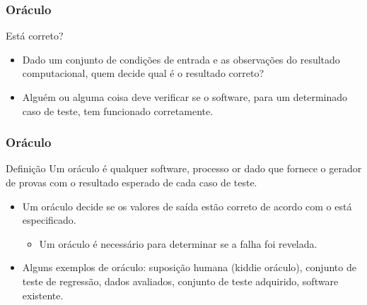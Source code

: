 \begin{frame}[parent={cmap:software-testing-foundations}, hasprev=false, hasnext=true]
\frametitle{Oráculo}

\begin{block:fact}{Está correto?}
\begin{itemize}
	\item Dado um conjunto de condições de entrada e as observações do resultado computacional, quem decide qual é o resultado correto?

	\item Alguém ou alguma coisa deve verificar se o software, para um determinado caso de teste, tem funcionado corretamente.
\end{itemize}
\end{block:fact}
\end{frame}


\begin{frame}[hasprev=true, hasnext=true]
\frametitle{Oráculo}
\label{concept:oracle}

\begin{block:concept}{Definição}
Um oráculo é qualquer software, processo or dado que fornece o gerador de provas com o resultado esperado de cada caso de teste.
\end{block:concept}

\begin{block:fact}{}
\begin{itemize}
	\item Um oráculo decide se os valores de saída estão correto de acordo com o está especificado.
	\begin{itemize}
		\item Um oráculo é necessário para determinar se a falha foi revelada.
	\end{itemize}

	\item Alguns exemplos de oráculo: suposição humana (kiddie oráculo), conjunto de teste de regressão, dados avaliados, conjunto de teste adquirido, software existente.
\end{itemize}
\end{block:fact}
\end{frame}



